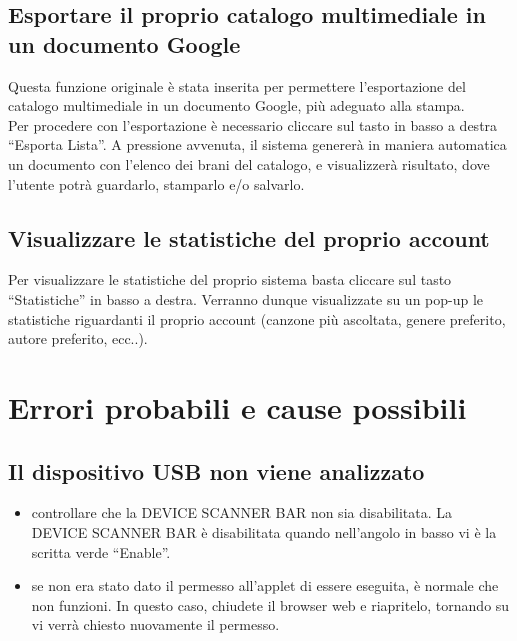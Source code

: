 \subsection{Esportare il proprio catalogo multimediale in un documento Google}

Questa funzione originale \`e stata inserita per permettere l'esportazione del
catalogo multimediale in un documento Google, pi\`u adeguato alla stampa.\\
Per procedere con l'esportazione \`e necessario cliccare sul tasto in
basso a destra ``Esporta Lista''. A pressione avvenuta, il sistema generer\`a
in maniera automatica un documento con l'elenco dei brani del catalogo, e
visualizzer\`a risultato, dove l'utente potr\`a guardarlo, stamparlo e/o salvarlo.

\subsection{Visualizzare le statistiche del proprio account}

Per visualizzare le statistiche del proprio sistema basta cliccare sul tasto
``Statistiche'' in basso a destra. Verranno dunque visualizzate su un pop-up le
statistiche riguardanti il proprio account (canzone pi\`u
ascoltata, genere preferito, autore preferito, ecc..).

\section{Errori probabili e cause possibili}

\subsection*{Il dispositivo USB non viene analizzato}
\begin{itemize}
  \item controllare che la DEVICE SCANNER BAR non sia disabilitata. La DEVICE
  SCANNER BAR \`e disabilitata quando nell'angolo in basso vi \`e la scritta
  verde ``Enable''.
  \item se non era stato dato il permesso all'applet di essere eseguita, \`e
  normale che non funzioni. In questo caso, chiudete il browser web e
  riapritelo, tornando su  vi verr\`a chiesto nuovamente il
  permesso.
\end{itemize}

